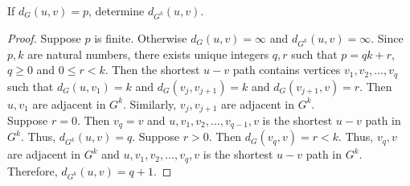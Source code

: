 \begin{exercise}
	If $d_G(u,v) = p$, determine $d_{G^k}(u,v)$.
\end{exercise}
\begin{proof}
	Suppose $p$ is finite. Otherwise $d_G(u,v) = \infty$ and  $d_{G^k}(u,v) = \infty$.
	Since $p,k$ are natural numbers, there exists unique integers $q,r$ such that $p = qk+r$, $q \ge 0$ and $0 \le r < k$. Then the shortest $u-v$ path contains vertices $v_1,v_2,\dots,v_q$ such that $d_G(u,v_1) = k$ and $d_G(v_j,v_{j+1}) = k$ and $d_G(v_{j+1},v) = r$. Then $u,v_1$ are adjacent in $G^k$. Similarly, $v_j,v_{j+1}$ are adjacent in $G^k$.\\

	Suppose $r = 0$. Then $v_q = v$ and $u,v_1,v_2,\dots,v_{q-1},v$ is the shortest $u-v$ path in $G^k$. Thus, $d_{G^k}(u,v) = q$. Suppose $r > 0$. Then $d_G(v_q,v) = r < k$. Thus, $v_q,v$ are adjacent in $G^k$ and $u,v_1,v_2,\dots,v_q,v$ is the shortest $u-v$ path in $G^k$. Therefore, $d_{G^k}(u,v) = q+1$.
\end{proof}

